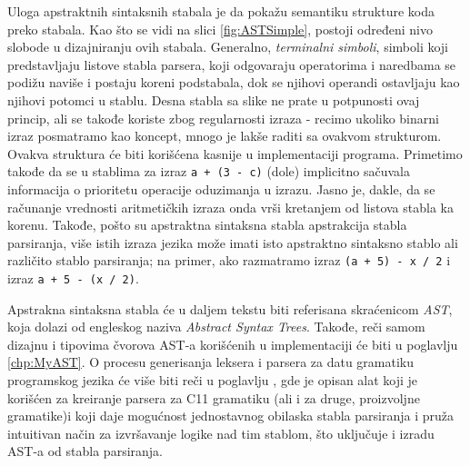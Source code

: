 Uloga apstraktnih sintaksnih stabala je da pokažu semantiku strukture koda preko stabala. Kao što se vidi na slici \ref{fig:ASTSimple}, postoji određeni nivo slobode u dizajniranju ovih stabala. Generalno, \emph{terminalni simboli}, simboli koji predstavljaju listove stabla parsera, koji odgovaraju operatorima i naredbama se podižu naviše i postaju koreni podstabala, dok se njihovi operandi ostavljaju kao njihovi potomci u stablu. Desna stabla sa slike ne prate u potpunosti ovaj princip, ali se takođe koriste zbog regularnosti izraza - recimo ukoliko binarni izraz posmatramo kao koncept, mnogo je lakše raditi sa ovakvom strukturom. Ovakva struktura će biti korišćena kasnije u implementaciji programa. Primetimo takođe da se u stablima za izraz \texttt{a + (3 - c)} (dole) implicitno sačuvala informacija o prioritetu operacije oduzimanja u izrazu. Jasno je, dakle, da se računanje vrednosti aritmetičkih izraza onda vrši kretanjem od listova stabla ka korenu. Takođe, pošto su apstraktna sintaksna stabla apstrakcija stabla parsiranja, više istih izraza jezika može imati isto apstraktno sintaksno stablo ali različito stablo parsiranja; na primer, ako razmatramo izraz \texttt{(a + 5) - x / 2} i izraz \texttt{a + 5 - (x / 2)}.

Apstrakna sintaksna stabla će u daljem tekstu biti referisana skraćenicom \emph{AST}, koja dolazi od engleskog naziva \emph{Abstract Syntax Trees}. Takođe, reči samom dizajnu i tipovima čvorova AST-a korišćenih u implementaciji će biti u poglavlju \ref{chp:MyAST}. O procesu generisanja leksera i parsera za datu gramatiku programskog jezika će više biti reči u poglavlju \cite{sec:ANTLR4}, gde je opisan alat koji je korišćen za kreiranje parsera za C11 gramatiku (ali i za druge, proizvoljne gramatike)i koji daje mogućnost jednostavnog obilaska stabla parsiranja i pruža intuitivan način za izvršavanje logike nad tim stablom, što uključuje i izradu AST-a od stabla parsiranja.
